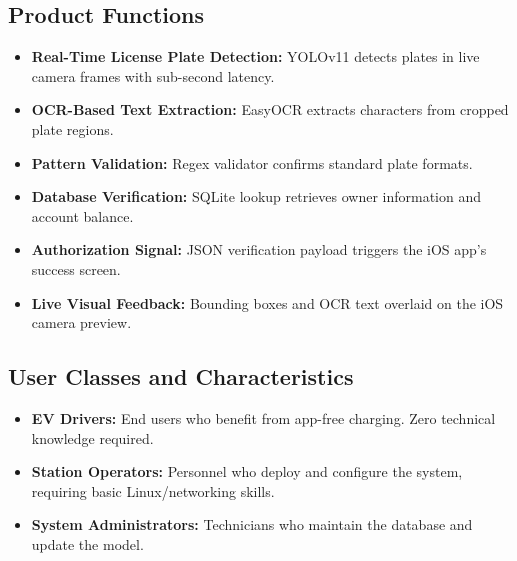 \documentclass[11pt]{report}
\begin{document}
\subsection{Product Functions}
\begin{itemize}
    \item \textbf{Real-Time License Plate Detection:} YOLOv11 detects plates in live camera frames with sub-second latency.
    \item \textbf{OCR-Based Text Extraction:} EasyOCR extracts characters from cropped plate regions.
    \item \textbf{Pattern Validation:} Regex validator confirms standard plate formats.
    \item \textbf{Database Verification:} SQLite lookup retrieves owner information and account balance.
    \item \textbf{Authorization Signal:} JSON verification payload triggers the iOS app's success screen.
    \item \textbf{Live Visual Feedback:} Bounding boxes and OCR text overlaid on the iOS camera preview.
\end{itemize}

\subsection{User Classes and Characteristics}
\begin{itemize}
    \item \textbf{EV Drivers:} End users who benefit from app-free charging. Zero technical knowledge required.
    \item \textbf{Station Operators:} Personnel who deploy and configure the system, requiring basic Linux/networking skills.
    \item \textbf{System Administrators:} Technicians who maintain the database and update the model.
\end{itemize}
\end{document}
